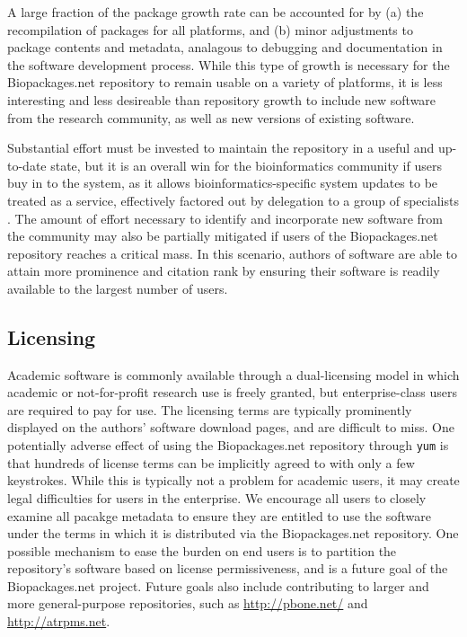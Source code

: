 A large fraction of the package growth rate can be accounted for by (a) the
recompilation of packages for all platforms, and (b) minor adjustments to
package contents and metadata, analagous to debugging and documentation in the
software development process.  While this type of growth is necessary for the
Biopackages.net repository to remain usable on a variety of platforms, it is
less interesting and less desireable than repository growth to include new
software from the research community, as well as new versions of existing
software.

Substantial effort must be invested to maintain the repository in a useful and
up-to-date state, but it is an overall win for the bioinformatics community if
users buy in to the system, as it allows bioinformatics-specific system
updates to be treated as a service, effectively factored out by delegation to a
group of specialists \cite{nation,soap}.  The amount of effort necessary
to identify and incorporate new software from the community may also be
partially mitigated if users of the Biopackages.net repository reaches a
critical mass.  In this scenario, authors of software are able to attain more
prominence and citation rank by ensuring their software is readily available to
the largest number of users.

\subsection{Licensing}

Academic software is commonly available through a dual-licensing model in which
academic or not-for-profit research use is freely granted, but enterprise-class
users are required to pay for use.  The licensing terms are typically
prominently displayed on the authors' software download pages, and are
difficult to miss.  One potentially adverse effect of using the Biopackages.net
repository through \texttt{yum} is that hundreds of license terms can be
implicitly agreed to with only a few keystrokes.  While this is typically not a
problem for academic users, it may create legal difficulties for users in the
enterprise.  We encourage all users to closely examine all pacakge metadata to
ensure they are entitled to use the software under the terms in which it is
distributed via the Biopackages.net repository.  One possible mechanism to ease
the burden on end users is to partition the repository's software based on
license permissiveness, and is a future goal of the
Biopackages.net project.  Future goals also include contributing to larger and
more general-purpose repositories, such as \url{http://pbone.net/} and
\url{http://atrpms.net}.

